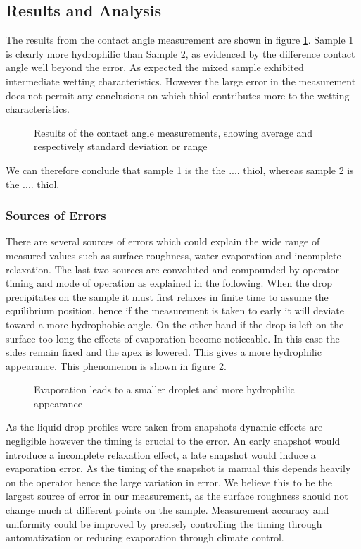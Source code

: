 \subsection{Results and Analysis}

The results from the contact angle measurement are shown in figure \ref{fig:results}. Sample 1 is clearly more hydrophilic than Sample 2, as evidenced by the difference contact angle well beyond the error. As expected the mixed sample exhibited intermediate wetting characteristics. However the large error in the measurement does not permit any conclusions on which thiol contributes more to the wetting characteristics.

\begin{figure}
\centering

\caption{Results of the contact angle measurements, showing average and  respectively standard deviation or range}
\label{fig:results}
\end{figure}

We can therefore conclude that sample 1 is the the .... thiol, whereas sample 2 is the .... thiol.


\subsubsection{Sources of Errors}

There are several sources of errors which could explain the wide range of measured values such as surface roughness, water evaporation and incomplete relaxation. The last two sources are convoluted and compounded by operator timing and mode of operation as explained in the following.
When the drop precipitates on the sample it must first relaxes in finite time to assume the equilibrium position, hence if the measurement is taken to early it will deviate toward a more hydrophobic angle.
On the other hand if the drop is left on the surface too long the effects of evaporation become noticeable. In this case the sides remain fixed and the apex is lowered. This gives a more hydrophilic appearance. This phenomenon is shown in figure \ref{fig:evaporation}.

\begin{figure}
\centering

\caption{Evaporation leads to a smaller droplet and more hydrophilic appearance}
\label{fig:evaporation}
\end{figure}

As the liquid drop profiles were taken from snapshots dynamic effects are negligible however the timing is crucial to the error. An early snapshot would introduce a incomplete relaxation effect, a late snapshot would induce a evaporation error. As the timing of the snapshot is manual this depends heavily on the operator hence the large variation in error.
We believe this to be the largest source of error in our measurement, as the surface roughness should not change much at different points on the sample. Measurement accuracy and uniformity could be improved by precisely controlling the timing through automatization or reducing evaporation through climate control.
